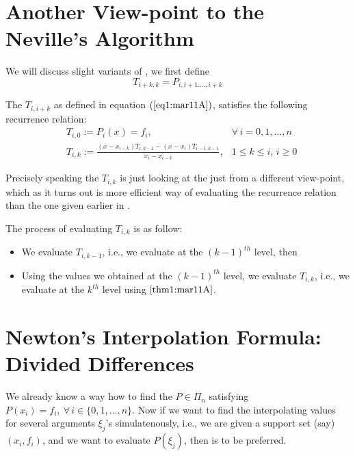 
\section{Another View-point to the Neville's Algorithm}
We will discuss slight variants of , we first define 
\begin{equation}\label{eq1:mar11A}
    T_{i+k,k} = P_{i,i+1.\dots,i+k}
\end{equation}

\begin{thm}\label{thm1:mar11A}
    The $T_{i,i+k}$ as defined in equation $(\ref{eq1:mar11A})$, satisfies the following recurrence relation:
    \begin{align*}
        &T_{i,0} := P_i(x) = f_i, &\forall \, i = 0,1,\dots,n \\ 
        &T_{i,k} := \frac{(x-x_{i-k})T_{i,k-1} - (x-x_i)T_{i-1,k-1}}{x_i - x_{i-k}}, &1 \leq k \leq i, \, i \geq 0 
    \end{align*}
\end{thm}

Precisely speaking the $T_{i,k}$ is just looking at the  just from a different view-point, which as it turns out is more efficient way of evaluating the recurrence relation than the one given earlier in .

The process of evaluating $T_{i,k}$ is as follow:
\begin{itemize}
    \item We evaluate $T_{i,k-1}$, i.e., we evaluate at the $(k-1)^{th}$ level, then
    \item Using the values we obtained at the $(k-1)^{th}$ level, we evaluate $T_{i,k}$, i.e., we evaluate at the $k^{th}$ level using  $\ref{thm1:mar11A}$.
\end{itemize}

\section{Newton's Interpolation Formula: Divided Differences}

We already know a way how to find the $P \in \Pi_n$ satisfying $P(x_i) = f_i, \ \forall \, i \in \{0,1,\dots,n\}$. Now
if we want to find the interpolating values for several arguments $\xi_j$'s simulatenously, i.e., we are given a support set (say) $(x_i,f_i)$, and we want to evaluate $P(\xi_j)$, then  is to be preferred.

